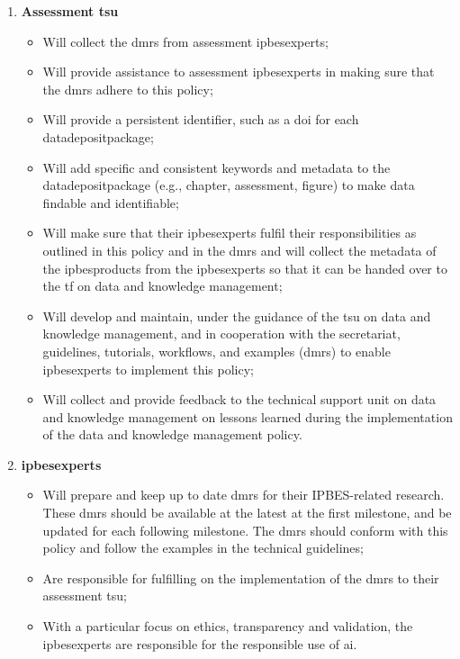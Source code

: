 \documentclass{article}
\begin{document}
\begin{enumerate}[label=(\alph*)]
    \item \textbf{Assessment \gls{tsu}}
    \begin{itemize}
        \item Will collect the \glspl{dmr} from assessment \glspl{ipbesexpert};
        \item Will provide assistance to assessment \glspl{ipbesexpert} in making sure that the \glspl{dmr} adhere to this policy;
        \item Will provide a persistent identifier, such as a \gls{doi} for each \gls{datadepositpackage};
        \item Will add specific and consistent keywords and metadata to the \gls{datadepositpackage} (e.g., chapter, assessment, figure) to make \gls{data} findable and identifiable;
        \item Will make sure that their \glspl{ipbesexpert} fulfil their responsibilities as outlined in this policy and in the \glspl{dmr} and will collect the metadata of the \glspl{ipbesproduct} from the \glspl{ipbesexpert} so that it can be handed over to the \gls{tf} on data and knowledge management;
        \item Will develop and maintain, under the guidance of the \gls{tsu} on \gls{data} and \gls{knowledge} management, and in cooperation with the \gls{secretariat}, guidelines, tutorials, \glspl{workflow}, and examples (\glspl{dmr}) to enable \glspl{ipbesexpert} to implement this policy;
        \item Will collect and provide feedback to the {technical support unit on data and knowledge management} on lessons learned during the implementation of the \gls{data} and \gls{knowledge} management policy.
    \end{itemize}

    \item \textbf{\glspl{ipbesexpert}}
    \begin{itemize}
        \item Will prepare and keep up to date \glspl{dmr} for their IPBES-related \gls{research}. These \glspl{dmr} should be available at the latest at the first \gls{milestone}, and be updated for each following \gls{milestone}. The \glspl{dmr} should conform with this policy and follow the examples in the technical guidelines;
        \item Are responsible for fulfilling on the implementation of the \glspl{dmr} to their assessment  \gls{tsu};
        \item With a particular focus on ethics, transparency and validation, the \glspl{ipbesexpert} are responsible for the responsible use of \gls{ai}.
    \end{itemize}
\end{enumerate}
\end{document}
